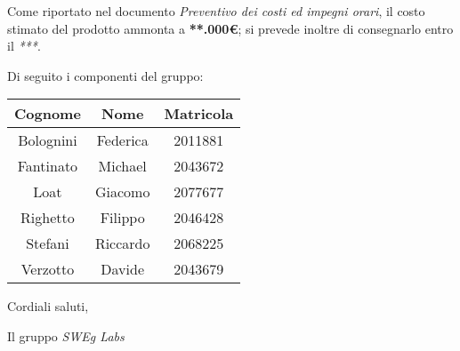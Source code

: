 Come riportato nel documento \emph{Preventivo dei costi ed impegni orari}, il costo stimato del prodotto ammonta a \textbf{**.000€};
si prevede inoltre di consegnarlo entro il \emph{***}.

\vspace{0.5cm}

Di seguito i componenti del gruppo:

\begin{table}[h]
    \centering
    \begin{tabular}{|c|c|c|}
        \hline
        \rowcolor[gray]{0.9}
        \textbf{Cognome} & \textbf{Nome} & \textbf{Matricola}\\
        \hline
        Bolognini & Federica & 2011881 \\
        \hline
        Fantinato & Michael & 2043672 \\
        \hline
        Loat & Giacomo & 2077677 \\
        \hline
        Righetto & Filippo & 2046428 \\
        \hline
        Stefani & Riccardo & 2068225 \\
        \hline
        Verzotto & Davide & 2043679 \\
        \hline
    \end{tabular}
\end{table}

\vspace{0.5cm}

Cordiali saluti,
\begin{flushright}
    Il gruppo \emph{SWEg Labs}
\end{flushright}

